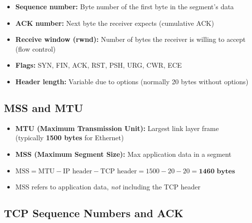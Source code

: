 \begin{imagebox}
\end{imagebox}

\begin{keybox}
\begin{itemize}[noitemsep]
    \item \textbf{Sequence number:} Byte number of the first byte in the segment's data
    \item \textbf{ACK number:} Next byte the receiver expects (cumulative ACK)
    \item \textbf{Receive window (rwnd):} Number of bytes the receiver is willing to accept (flow control)
    \item \textbf{Flags:} SYN, FIN, ACK, RST, PSH, URG, CWR, ECE
    \item \textbf{Header length:} Variable due to options (normally 20 bytes without options)
\end{itemize}
\end{keybox}

\subsection{MSS and MTU}

\begin{formulabox}
\begin{itemize}[noitemsep]
    \item \textbf{MTU (Maximum Transmission Unit):} Largest link layer frame (typically \textbf{1500 bytes} for Ethernet)
    \item \textbf{MSS (Maximum Segment Size):} Max application data in a segment
    \item $\text{MSS} = \text{MTU} - \text{IP header} - \text{TCP header} = 1500 - 20 - 20 = \textbf{1460 bytes}$
    \item MSS refers to application data, \emph{not} including the TCP header
\end{itemize}
\end{formulabox}

\subsection{TCP Sequence Numbers and ACK}

